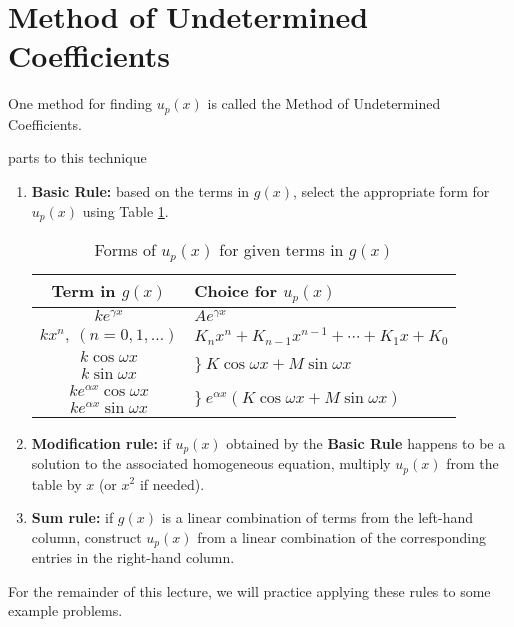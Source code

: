 \section{Method of Undetermined Coefficients}
One method for finding $u_p(x)$ is called the Method of Undetermined Coefficients.

 parts to this technique

\begin{enumerate}
\item \textbf{Basic Rule:} based on the terms in $g(x)$, select the appropriate form for $u_p(x)$ using Table \ref{tab:method-of-guessing-table}.

\begin{table}[h]
\begin{center}
\begin{tabular}{|c|l|}
\hline
Term in $g(x)$ & Choice for $u_p(x)$ \\\hline%

$ke^{\gamma x}$ & $Ae^{\gamma x}$ \\\hline
$kx^{n}, \ (n=0,1,\dots)$ & $K_nx^n+K_{n-1}x^{n-1}+\cdots +K_1x+K_0$\\\hline
$k \cos{\omega x}$ & \multirow{2}{*}{$\Big\} \ K\cos{\omega x} + M\sin{\omega x}$}\\\cline{1-1}
$k \sin{\omega x}$ &                 \\\hline
$ke^{\alpha x}\cos{\omega x}$   & \multirow{2}{*}{$\Big\} \ e^{\alpha x}\left(K\cos{\omega x} + M\sin{\omega x}\right)$}\\\cline{1-1} 
$ke^{\alpha x}\sin{\omega x}$ &      \\\hline
\end{tabular}
\end{center}
\caption{Forms of $u_p(x)$ for given terms in $g(x)$}
\label{tab:method-of-guessing-table}
\end{table}

\item \textbf{Modification rule:} if $u_p(x)$ obtained by the \textbf{Basic Rule} happens to be a solution to the associated homogeneous equation, multiply $u_p(x)$ from the table by $x$ (or $x^2$ if needed).

\item \textbf{Sum rule:} if $g(x)$ is a linear combination of terms from the left-hand column, construct $u_p(x)$ from a linear combination of the corresponding entries in the right-hand column.
\end{enumerate}
For the remainder of this lecture, we will practice applying these rules to some example problems.

